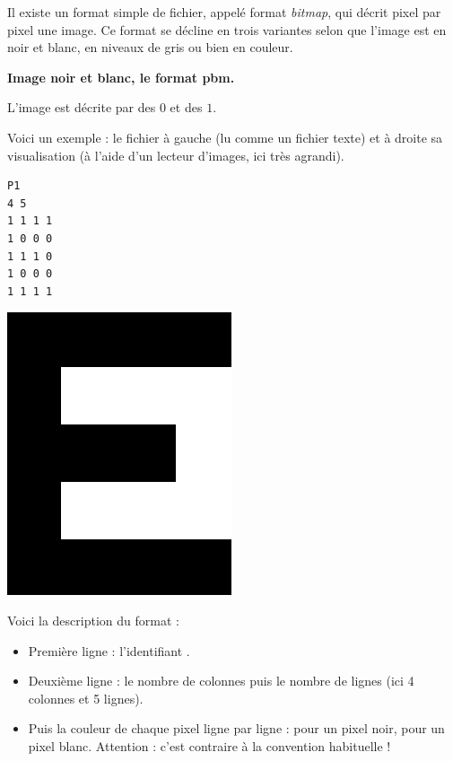 \documentclass[11pt,class=report,crop=false]{standalone}
\begin{document}
\begin{cours}


Il existe un format simple de fichier, appelé format \emph{bitmap}, qui décrit pixel par pixel une image. Ce format se décline en trois variantes 
selon que l'image est en noir et blanc, en niveaux de gris ou bien en couleur.

\medskip

\textbf{Image noir et blanc, le format \og{}pbm\fg{}.}

L'image est décrite par des $0$ et des $1$.

Voici un exemple : le fichier  à gauche (lu comme un fichier texte)  et à droite sa visualisation (à l'aide d'un lecteur d'images, ici très agrandi).
\begin{center}
\begin{minipage}{0.3\textwidth}
\begin{lstlisting}
P1
4 5
1 1 1 1
1 0 0 0
1 1 1 0
1 0 0 0
1 1 1 1
\end{lstlisting}
\end{minipage}
\begin{minipage}{0.3\textwidth}
\includegraphics[scale=0.2]{ecran-cours-image_nb}
\end{minipage}
\end{center}

Voici la description du format :
\begin{itemize}
  \item Première ligne : l'identifiant .
  \item Deuxième ligne : le nombre de colonnes puis le nombre de lignes (ici 4 colonnes et 5 lignes).
  \item Puis la couleur de chaque pixel ligne par ligne :  pour un pixel noir,  pour un pixel blanc. Attention : c'est contraire à la convention habituelle !
\end{itemize}  
  

\end{cours}
\end{document}
